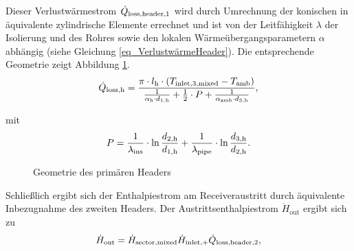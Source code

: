 Dieser Verlustwärmestrom $\dot{Q}_{\mathrm{loss,header,1}}$ wird durch Umrechnung der konischen in äquivalente zylindrische Elemente errechnet und ist von der Leitfähigkeit $\lambda$ der Isolierung und des Rohres sowie den lokalen Wärmeübergangsparametern $\alpha$ abhängig (siehe Gleichung \ref{eq_VerlustwärmeHeader}).
Die entsprechende Geometrie zeigt Abbildung \ref{fig_header}.
\begin{equation} \label{eq_VerlustwärmeHeader}
    \dot{Q}_{\text {loss}, \mathrm{h}}=
    \frac{\pi \cdot l_{\mathrm{h}} \cdot\left(T_{\mathrm{inlet,3,mixed}}-T_{\text {amb}}\right)}
{\frac{1}{\alpha_{\mathrm{h}} \cdot d_{1, \mathrm{h}}}+\frac{1}{2} \cdot P+\frac{1}{\alpha_{\mathrm{amb}} \cdot d_{3, \mathrm{\mathrm{h}}}}},
\end{equation}

\vspace*{-\baselineskip}mit
\begin{equation} \label{eq_BestimmungHilfsgrößenHeader}
P=\frac{1}{\lambda_{\text {ins}}} \cdot \ln \frac{d_{2, \mathrm{h}}}{d_{1, \mathrm{h}}}+\frac{1}{\lambda_{\text {pipe}}} \cdot \ln \frac{d_{3, \mathrm{h}}}{d_{2, \mathrm{h}}}.
\end{equation}

\begin{figure}[h!]
    \centering
    \setlength{\fboxsep}{1pt}
    \setlength{\fboxrule}{1pt}
    \caption[Geometrie des primären Headers]{Geometrie des primären Headers \cite[S.97]{DissGall}}
    \label{fig_header}
\end{figure}

\vspace*{-\baselineskip}Schließlich ergibt sich der Enthalpiestrom am Receiveraustritt durch äquivalente Inbezugnahme des zweiten Headers.
Der Austrittsenthalpiestrom $\dot{H}_{\mathrm{out}}$ ergibt sich zu
\begin{equation} \label{eq_Headerout1}
\dot{H}_{\mathrm{out}} = \dot{H}_{\mathrm{sector,mixed}}\dot{H}_{\mathrm{inlet,}+} \dot{Q}_{\mathrm{loss,header,2}},
\end{equation}

